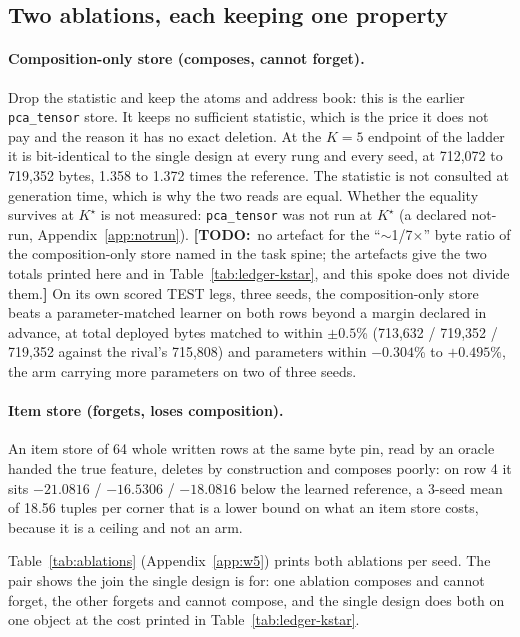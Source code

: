 \documentclass{article}
\newcommand{\TODO}[1]{{\color{orange}\textbf{[TODO:}~#1\textbf{]}}}
\newcommand{\Kstar}{\ensuremath{K^{\star}}}
\begin{document}
\subsection{Two ablations, each keeping one property}
\label{sec:ablations}

\paragraph{Composition-only store (composes, cannot forget).} Drop the statistic and keep the
atoms and address book: this is the earlier \texttt{pca\_tensor} store. It keeps no sufficient
statistic, which is the price it does not pay and the reason it has no exact deletion. At the
$K=5$ endpoint of the ladder it is bit-identical to the single design at every rung and every
seed, at 712,072 to 719,352 bytes, 1.358 to 1.372 times the reference.
The statistic is not consulted at generation time, which is why the two reads are equal.
Whether the equality survives at $\Kstar$ is not measured: \texttt{pca\_tensor} was not run at
$\Kstar$ (a declared not-run, Appendix~\ref{app:notrun}). \TODO{no artefact for the
``$\sim$1/7$\times$'' byte ratio of the composition-only store named in the task spine; the
artefacts give the two totals printed here and in Table~\ref{tab:ledger-kstar}, and this spoke
does not divide them.}
On its own scored TEST legs, three seeds, the composition-only store beats a parameter-matched
learner on both rows beyond a margin declared in advance, at total deployed bytes matched to
within $\pm0.5$\% (713,632 / 719,352 / 719,352 against the rival's 715,808) and parameters within
$-0.304$\% to $+0.495$\%, the arm carrying more parameters on two of three seeds.

\paragraph{Item store (forgets, loses composition).} An item store of 64 whole written rows at
the same byte pin, read by an oracle handed the true feature, deletes by construction and
composes poorly: on row 4 it sits $-21.0816$ / $-16.5306$ / $-18.0816$ below the learned
reference, a 3-seed mean of 18.56 tuples per corner that is a lower bound on what an item store
costs, because it is a ceiling and not an arm.

Table~\ref{tab:ablations} (Appendix~\ref{app:w5}) prints both ablations per seed. The pair shows
the join the single design is for: one ablation composes and cannot
forget, the other forgets and cannot compose, and the single design does both on one object at
the cost printed in Table~\ref{tab:ledger-kstar}.
\end{document}
